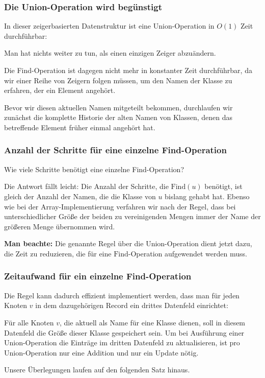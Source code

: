 \documentclass[smaller,xcolor=dvipsnames]{beamer}
\newcommand{\opfind}{\text{Find}}
\newcommand{\opunion}{\text{Union}}
\begin{document}
\begin{frame}
\frametitle{Die Union-Operation wird begünstigt}
In dieser zeigerbasierten Datenstruktur ist eine \alert{Union-Operation in $O(1)$ Zeit} durchführbar: 
\begin{center}
 \alert{Man hat nichts weiter zu tun, als einen einzigen Zeiger abzuändern.}
\end{center}
\alert{Die Find-Operation ist dagegen nicht mehr in konstanter Zeit durchführbar}, da wir einer Reihe von Zeigern folgen müssen, um den Namen der Klasse zu erfahren, der ein Element angehört. \\ \medskip

Bevor wir diesen aktuellen Namen mitgeteilt bekommen, durchlaufen wir zunächst die komplette Historie der alten Namen von Klassen, denen das betreffende Element früher einmal angehört hat.
\end{frame}

\begin{frame}
\frametitle{Anzahl der Schritte für eine einzelne Find-Operation}
\alert{Wie viele Schritte benötigt eine einzelne Find-Operation?} \\ \medskip

Die Antwort fällt leicht: Die Anzahl der Schritte, die $\opfind{(u)}$ benötigt, ist gleich der Anzahl der Namen, die die Klasse von $u$ bislang gehabt hat. Ebenso wie bei der Array-Implementierung verfahren wir nach der \alert{Regel, dass bei unterschiedlicher Größe der beiden zu vereinigenden Mengen immer der Name der größeren Menge übernommen wird}. \\ \medskip

\textbf{Man beachte:} Die genannte Regel über die $\opunion$-Operation dient jetzt dazu, die Zeit zu reduzieren, die für eine $\opfind$-Operation aufgewendet werden muss.
\end{frame}

\begin{frame}
\frametitle{Zeitaufwand für ein einzelne Find-Operation}
Die Regel kann dadurch effizient implementiert werden, dass man für jeden Knoten $v$ in dem dazugehörigen Record \alert{ein drittes Datenfeld} einrichtet: \\ \medskip

\alert{Für alle Knoten $v$, die aktuell als Name für eine Klasse dienen, soll in diesem Datenfeld die Größe dieser Klasse gespeichert sein}. Um bei Ausführung einer Union-Operation die Einträge im dritten Datenfeld zu aktualisieren, ist pro $\opunion$-Operation nur eine Addition und nur ein Update nötig.

Unsere Überlegungen laufen auf den folgenden Satz hinaus.
\end{frame}
\end{document}
